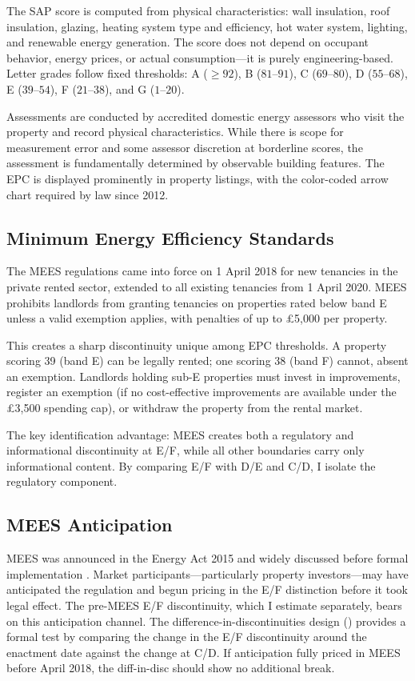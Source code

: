 \documentclass[12pt]{article}
\begin{document}
The SAP score is computed from physical characteristics: wall insulation, roof insulation, glazing, heating system type and efficiency, hot water system, lighting, and renewable energy generation. The score does not depend on occupant behavior, energy prices, or actual consumption---it is purely engineering-based. Letter grades follow fixed thresholds: A ($\geq 92$), B ($81$--$91$), C ($69$--$80$), D ($55$--$68$), E ($39$--$54$), F ($21$--$38$), and G ($1$--$20$).

Assessments are conducted by accredited domestic energy assessors who visit the property and record physical characteristics. While there is scope for measurement error and some assessor discretion at borderline scores, the assessment is fundamentally determined by observable building features. The EPC is displayed prominently in property listings, with the color-coded arrow chart required by law since 2012.

\subsection{Minimum Energy Efficiency Standards}

The MEES regulations came into force on 1 April 2018 for new tenancies in the private rented sector, extended to all existing tenancies from 1 April 2020. MEES prohibits landlords from granting tenancies on properties rated below band E unless a valid exemption applies, with penalties of up to \pounds 5,000 per property.

This creates a sharp discontinuity unique among EPC thresholds. A property scoring 39 (band E) can be legally rented; one scoring 38 (band F) cannot, absent an exemption. Landlords holding sub-E properties must invest in improvements, register an exemption (if no cost-effective improvements are available under the \pounds 3,500 spending cap), or withdraw the property from the rental market.

The key identification advantage: MEES creates both a regulatory and informational discontinuity at E/F, while all other boundaries carry only informational content. By comparing E/F with D/E and C/D, I isolate the regulatory component.

\subsection{MEES Anticipation}\label{sec:anticipation}

MEES was announced in the Energy Act 2015 and widely discussed before formal implementation \citep{energyact2015}. Market participants---particularly property investors---may have anticipated the regulation and begun pricing in the E/F distinction before it took legal effect. The pre-MEES E/F discontinuity, which I estimate separately, bears on this anticipation channel. The difference-in-discontinuities design () provides a formal test by comparing the change in the E/F discontinuity around the enactment date against the change at C/D. If anticipation fully priced in MEES before April 2018, the diff-in-disc should show no additional break.
\end{document}
